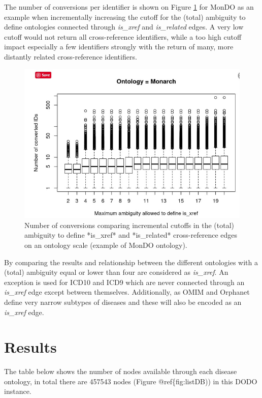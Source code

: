 \documentclass[9pt,a4paper,]{extarticle}
\begin{document}
The number of conversions per identifier is shown on Figure \ref{fig:boxplotAmbiguity} for MonDO as an example when incrementally increasing the cutoff for the (total) ambiguity to define ontologies connected through \emph{is\_xref} and \emph{is\_related} edges. A very low cutoff would not return all cross-reference identifiers, while a too high cutoff impact especially a few identifiers strongly with the return of many, more distantly related cross-reference identifiers.

\begin{figure}

{\centering \includegraphics[width=0.5\linewidth]{fig/boxplot_ambiguity_conversion_mondo} 

}

\caption{Number of conversions comparing incremental cutoffs in the (total) ambiguity to define *is\_xref* and *is\_related* cross-reference edges on an ontology scale (example of MonDO ontology).}\label{fig:boxplotAmbiguity}
\end{figure}

By comparing the results and relationship between the different ontologies with a (total) ambiguity equal or lower than four are considered as \emph{is\_xref}. An exception is used for ICD10 and ICD9 which are never connected through an \emph{is\_xref} edge except between themselves. Additionally, as OMIM and Orphanet define very narrow subtypes of diseases and these will also be encoded as an \emph{is\_xref} edge.

\hypertarget{results}{%
\section{Results}\label{results}}

The table below shows the number of nodes available through each disease ontology, in total there are 457543 nodes (Figure @ref\{fig:listDB)) in this DODO instance.
\end{document}
